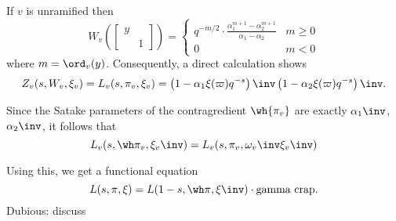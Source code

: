 \begin{theorem}
  If $v$ is unramified then
  \[
    W_v \left( \begin{bmatrix}
      y \\ & 1
  \end{bmatrix}\right)
  =
  \begin{cases}
    q^{-m/2} \cdot \frac{\alpha_1^{m+1}-\alpha_2^{m+1}}{\alpha_1-\alpha_2} & m \ge 0 \\
    0 & m < 0
  \end{cases}
\]
where $m = \ord_v(y)$.
Consequently, a direct calculation shows
\[ Z_v(s, W_v, \xi_v) = L_v(s, \pi_v, \xi_v)
  = \left( 1 - \alpha_1 \xi(\varpi) q^{-s} \right)\inv
  \left( 1 - \alpha_2 \xi(\varpi) q^{-s} \right)\inv. \]
\end{theorem}
Since the Satake parameters of the contragredient $\wh{\pi_v}$
are exactly $\alpha_1\inv$, $\alpha_2\inv$, it follows that
\[ L_v(s, \wh \pi_v, \xi_v\inv) = L_v(s, \pi_v, \omega_v\inv \xi_v\inv) \]

Using this, we get a functional equation
\[ L(s, \pi, \xi)=  L(1-s, \wh\pi, \xi\inv) \cdot \text{gamma crap}. \]
Dubious: discuss
